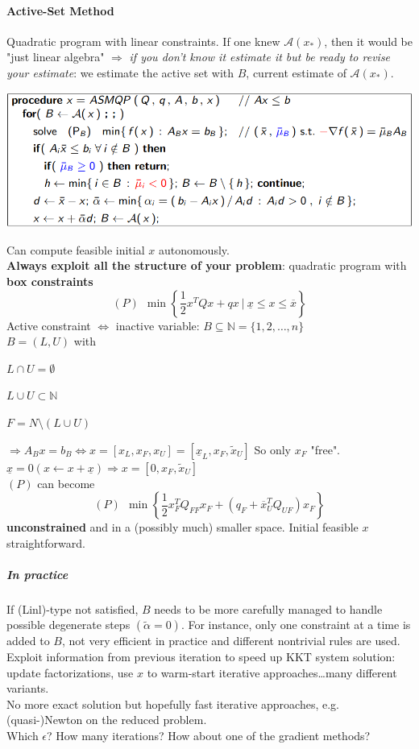 \documentclass[10pt]{report}
\begin{document}
\paragraph{Active-Set Method} Quadratic program with linear constraints. If one knew $\mathscr{A}(x_*)$, then it would be "just linear algebra" $\Rightarrow$ \textit{if you don't know it estimate it but be ready to revise your estimate}: we estimate the active set with $B$, current estimate of $\mathscr{A}(x_*)$.
\begin{center}
	\includegraphics[scale=0.75]{10.png}
\end{center}
Can compute feasible initial $x$ autonomously.\\
\textbf{Always exploit all the structure of your problem}: quadratic program with \textbf{box constraints} $$(P)\:\:\min\left\{\frac{1}{2}x^TQx+qx\:|\:\underline{x}\leq x\leq \overline{x}\right\}$$
Active constraint $\Leftrightarrow$ inactive variable: $B\subseteq \mathbb{N}=\{1,2,\ldots,n\}$ \\$B = (L,U)$ with
\begin{list}{}{}
	\item $L\cap U=\emptyset$
	\item $L\cup U \subset \mathbb{N}$
	\item $F = N\setminus (L\cup U)$
\end{list}
$\Rightarrow A_Bx=b_B \Leftrightarrow x = [x_L, x_F, x_U]=[\underline{x}_L, x_F, \tilde{x}_U]$ So only $x_F$ "free".\\
$\underline{x} = 0 (x\leftarrow x+\underline{x})\Rightarrow x=[0, x_F, \tilde{x}_U]$\\
$(P)$ can become $$(P)\:\:\min\left\{\frac{1}{2}x_F^TQ_{FF}x_F+(q_F+\overline{x}_U^TQ_{UF})x_F\right\}$$ \textbf{unconstrained} and in a (possibly much) smaller space. Initial feasible $x$ straightforward.
\subparagraph{In practice} If (Linl)-type not satisfied, $B$ needs to be more carefully managed to handle possible degenerate steps $(\tilde{\alpha}=0)$. For instance, only one constraint at a time is added to $B$, not very efficient in practice and different nontrivial rules are used.\\
Exploit information from previous iteration to speed up KKT system solution: update factorizations, use $x$ to warm-start iterative approaches\ldots many different variants.\\
No more exact solution but hopefully fast iterative approaches, e.g. (quasi-)Newton on the reduced problem.\\
Which $\epsilon$? How many iterations? How about one of the gradient methods?
\end{document}

